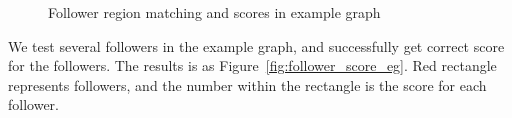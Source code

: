 \begin{figure}[htbp]
	  \centering
	\caption{Follower region matching and scores in example graph}
\end{figure}

We test several followers in the example graph, and successfully get correct score for the followers. The results is as Figure~\ref{fig:follower_score_eg}. Red rectangle represents followers, and the number within the rectangle is the score for each follower.
